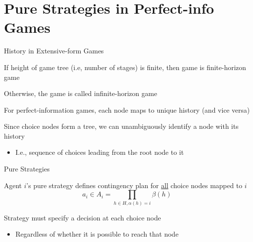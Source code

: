 \documentclass[11pt,aspectratio=169,handout]{beamer}
\begin{document}
  
 \section{Pure Strategies in Perfect-info Games}
 
  \begin{frame}{History in Extensive-form Games}
   \begin{itemizes}\small
    \item If height of game tree (i.e, number of stages) is finite, then game is \alert{finite-horizon} game
    \item Otherwise, the game is called \alert{infinite-horizon} game
    \item For perfect-information games, each node maps to unique history (and vice versa)
    \item Since choice nodes form a tree, we can unambiguously identify a node with its history
    \begin{itemize}
     \item I.e., sequence of choices leading from the root node to it
    \end{itemize}
   \end{itemizes}
  \end{frame} 
 
  \begin{frame}{Pure Strategies}
   \begin{itemizes}
    \item Agent $i$'s pure strategy defines contingency plan for \alert{\underline{all}} choice nodes mapped to $i$
    $$ a_i \in A_i = \prod_{h \in H, \alpha(h) = i}\beta(h) $$
    \item Strategy must specify a decision at each choice node
    \begin{itemize}
     \item Regardless of whether it is possible to reach that node
    \end{itemize}
   \end{itemizes}
  \end{frame}
\end{document}
